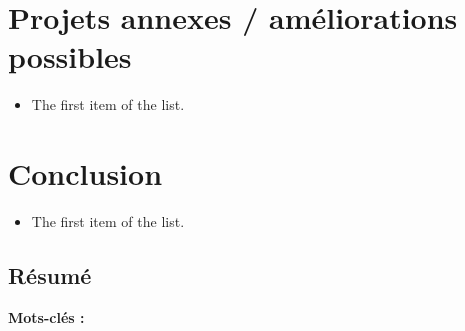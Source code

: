 \documentclass{rapport_stage}
\begin{document}
\chapter{Projets annexes / améliorations possibles}

\begin{itemize}[label=$\bullet$]
  \item The first item of the list.
\end{itemize}



\chapter*{Conclusion}  %

\begin{itemize}[label=$\bullet$]
  \item The first item of the list.
\end{itemize}%


\cleardoublepage



\printbibliography[
  heading=bibintoc,
  title=Bibliographie / Webographie
]

\cleardoublepage


\listoffigures
\cleardoublepage

\listoftables
\cleardoublepage

\newpage
\printglossaries

\cleardoublepage
\renewcommand{\thesubsection}{\Roman{subsection}}



\cleardoublepage
\thispagestyle{empty}

\section*{Résumé}
{}



{\bf Mots-clés :}
\end{document}
